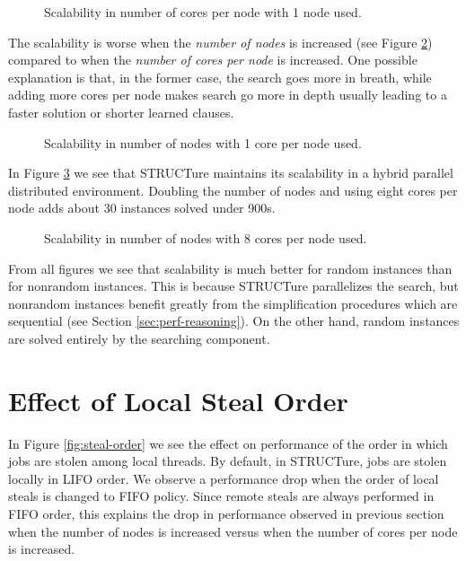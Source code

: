 \begin{figure}
  \centering
  \caption{Scalability in number of cores per node with 1 node used.}
  \label{fig:para-1X}
\end{figure}

The scalability is worse when the \emph{number of nodes} is increased
(see Figure \ref{fig:para-X1}) compared to when the \emph{number
of cores per node} is increased. One possible explanation is that,
in the former case, the search goes more in breath, while adding
more cores per node makes search go more in depth usually leading
to a faster solution or shorter learned clauses.

\begin{figure}
  \centering
  \caption{Scalability in number of nodes with 1 core per node used.}
  \label{fig:para-X1}
\end{figure}

In Figure \ref{fig:para-X8} we see that STRUCTure maintains
its scalability in a hybrid parallel distributed environment.
Doubling the number of nodes and using eight cores per node adds
about 30 instances solved under 900s.

\begin{figure}
  \centering
  \caption{Scalability in number of nodes with 8 cores per node used.}
  \label{fig:para-X8}
\end{figure}

From all figures we see that scalability is much better for random
instances than for nonrandom instances. This is because STRUCTure
parallelizes the search, but nonrandom instances benefit greatly
from the simplification procedures which are sequential (see Section
\ref{sec:perf-reasoning}). On the other hand, random instances are
solved entirely by the searching component.


\section{Effect of Local Steal Order}

In Figure \ref{fig:steal-order} we see the effect on performance of
the order in which jobs are stolen among local threads.  By default,
in STRUCTure, jobs are stolen locally in LIFO order. We observe a
performance drop when the order of local steals is changed to FIFO
policy.  Since remote steals are always performed in FIFO order,
this explains the drop in performance observed in previous section
when the number of nodes is increased versus when the number of
cores per node is increased.

